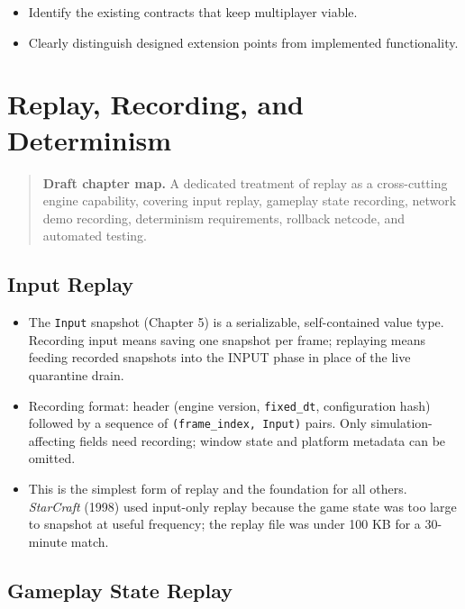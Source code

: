 \documentclass[
  11pt,
  letterpaper,
  DIV=11,
  numbers=noendperiod,
  twoside,
  open=right]{scrreprt}
\providecommand{\tightlist}{%
  \setlength{\itemsep}{0pt}\setlength{\parskip}{0pt}}
\begin{document}
\begin{itemize}
\tightlist
\item
  Identify the existing contracts that keep multiplayer viable.
\item
  Clearly distinguish designed extension points from implemented
  functionality.
\end{itemize}

\chapter{Replay, Recording, and
Determinism}\label{replay-recording-and-determinism}

\begin{quote}
\textbf{Draft chapter map.} A dedicated treatment of replay as a
cross-cutting engine capability, covering input replay, gameplay state
recording, network demo recording, determinism requirements, rollback
netcode, and automated testing.
\end{quote}

\section{Input Replay}\label{input-replay}

\begin{itemize}
\tightlist
\item
  The \texttt{Input} snapshot (Chapter 5) is a serializable,
  self-contained value type. Recording input means saving one snapshot
  per frame; replaying means feeding recorded snapshots into the INPUT
  phase in place of the live quarantine drain.
\item
  Recording format: header (engine version, \texttt{fixed\_dt},
  configuration hash) followed by a sequence of
  \texttt{(frame\_index,\ Input)} pairs. Only simulation-affecting
  fields need recording; window state and platform metadata can be
  omitted.
\item
  This is the simplest form of replay and the foundation for all others.
  \emph{StarCraft} (1998) used input-only replay because the game state
  was too large to snapshot at useful frequency; the replay file was
  under 100 KB for a 30-minute match.
\end{itemize}

\section{Gameplay State Replay}\label{gameplay-state-replay}
\end{document}
